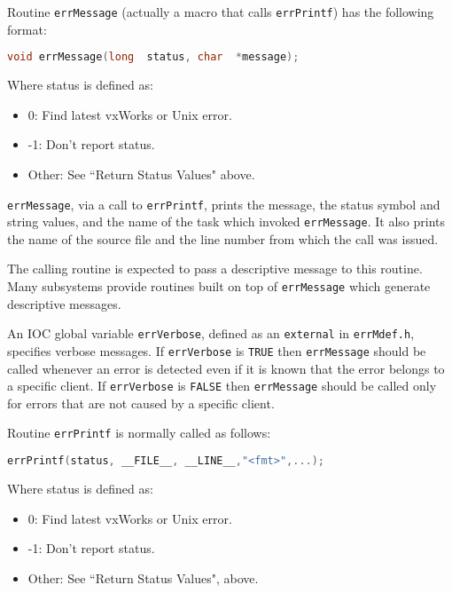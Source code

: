 Routine \verb|errMessage| (actually a macro that calls \verb|errPrintf|) has the following format:

\begin{lstlisting}[language=C]
void errMessage(long  status, char  *message);
\end{lstlisting}

Where status is defined as:

\begin{itemize}
\item 0: Find latest vxWorks or Unix error.

\item -1: Don't report status.

\item Other: See ``Return Status Values" above.

\end{itemize}

\verb|errMessage|, via a call to \verb|errPrintf|, prints the message, the status symbol and string values, and the name of the task which invoked \verb|errMessage|.
It also prints the name of the source file and the line number from which the call was issued.

The calling routine is expected to pass a descriptive message to this routine.
Many subsystems provide routines built on top of \verb|errMessage| which generate descriptive messages.

An IOC global variable \verb|errVerbose|, defined as an \verb|external| in \verb|errMdef.h|, specifies verbose messages.
If \verb|errVerbose| is \verb|TRUE| then \verb|errMessage| should be called whenever an error is detected even if it is known that the error belongs to a specific client.
If \verb|errVerbose| is \verb|FALSE| then \verb|errMessage| should be called only for errors that are not caused by a specific client.

Routine \verb|errPrintf| is normally called as follows:

\begin{lstlisting}[language=C]
errPrintf(status, __FILE__, __LINE__,"<fmt>",...);
\end{lstlisting}

Where status is defined as:

\begin{itemize}
\item 0: Find latest vxWorks or Unix error.

\item -1: Don't report status.

\item Other: See ``Return Status Values", above.

\end{itemize}

